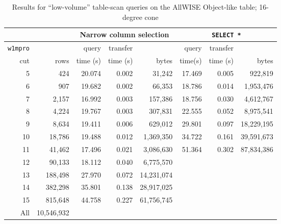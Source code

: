 \begin{table}[h]
\centering
\begin{tabular}{r r r r r r r r}
 & & \multicolumn{3}{c}{Narrow column selection} & \multicolumn{3}{c}{\texttt{SELECT *}} \\ \hline
\texttt{w1mpro} &  & query & transfer &  & query & transfer &  \\
cut & rows & time (s) & time (s) & bytes & time(s) & time (s) & bytes \\ \hline
5 & 424 & 20.074 & 0.002 & 31,242 & 17.469 & 0.005 & 922,819 \\
6 & 907 & 19.682 & 0.002 & 66,353 & 18.786 & 0.014 & 1,953,476 \\
7 & 2,157 & 16.992 & 0.003 & 157,386 & 18.756 & 0.030 & 4,612,767 \\
8 & 4,224 & 19.767 & 0.003 & 307,831 & 22.555 & 0.052 & 8,975,541 \\
9 & 8,634 & 19.411 & 0.006 & 629,012 & 29.801 & 0.097 & 18,229,195 \\
10 & 18,786 & 19.488 & 0.012 & 1,369,350 & 34.722 & 0.161 & 39,591,673 \\
11 & 41,462 & 17.496 & 0.021 & 3,086,630 & 51.364 & 0.302 & 87,834,386 \\
12 & 90,133 & 18.112 & 0.040 & 6,775,570 \\
13 & 188,498 & 27.970 & 0.072 & 14,231,074 \\
14 & 382,298 & 35.801 & 0.138 & 28,917,025 \\
15 & 815,648 & 44.758 & 0.227 & 61,756,745 \\
All & 10,546,932 \\
\end{tabular}
\caption{Results for ``low-volume'' table-scan queries on the AllWISE Object-like table; 16-degree cone}
\label{tab:lsp-00-10-16-degree-scans}
\end{table}



